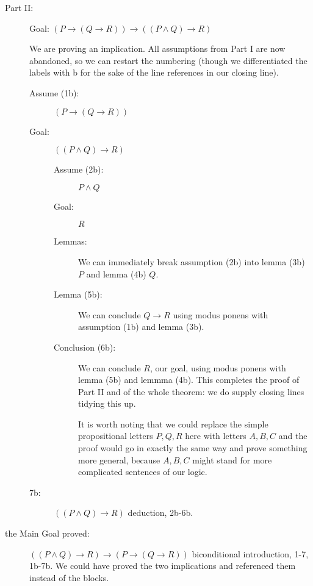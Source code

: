 \documentclass[12pt]{article}
\begin{document}
\begin{description}
\begin{description}
\end{description}

\newpage

\item[Part II:] Goal:  $(P \rightarrow (Q \rightarrow R))
\rightarrow ((P \wedge Q) \rightarrow R)$

We are proving an implication.  All assumptions from Part I
are now abandoned, so we can restart the numbering (though we differentiated the labels with b for the sake of the line references
in our closing line).

\begin{description}

\item[Assume (1b):]  $(P \rightarrow (Q \rightarrow R))$

\item[Goal:]  $((P \wedge Q) \rightarrow R)$

\begin{description}

\item[Assume (2b):]  $P \wedge Q$

\item[Goal:]  $R$

\item[Lemmas:]  We can immediately break assumption (2b) into lemma (3b) $P$
and lemma (4b) $Q$.

\item[Lemma (5b):]  We can conclude $Q \rightarrow R$ using modus ponens with
assumption (1b) and lemma (3b).  

\item[Conclusion (6b):] We can conclude $R$, our goal, using modus ponens
with lemma (5b) and lemmma (4b).  This completes the proof of Part II
and of the whole theorem:  we do supply closing lines tidying this up.

It is worth noting that we could replace the simple propositional letters $P,Q,R$ here with letters $A,B,C$ and the proof would go in exactly the same way and prove something more general, because $A,B,C$ might stand for more complicated sentences of our logic.


\end{description}

\item[7b:]  $((P \wedge Q) \rightarrow R)$  deduction, 2b-6b.


\end{description}

\item[the Main Goal proved:]  $((P \wedge Q) \rightarrow R) \rightarrow (P \rightarrow (Q
\rightarrow R))$  biconditional introduction, 1-7, 1b-7b.   We could have proved the two implications and referenced them instead of the blocks.
\end{description}
\end{document}
